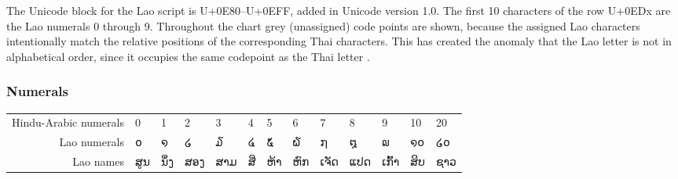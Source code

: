 The Unicode block for the Lao script is U+0E80–U+0EFF, added in Unicode version 1.0. The first 10 characters of the row U+0EDx are the Lao numerals 0 through 9. Throughout the chart grey (unassigned) code points are shown, because the assigned Lao characters intentionally match the relative positions of the corresponding Thai characters. This has created the anomaly that the Lao letter  is not in alphabetical order, since it occupies the same codepoint as the Thai letter .

\begin{scriptexample}[]{}
\end{scriptexample}

\subsubsection{Numerals}
\bgroup
\lao
\begin{tabular}{rllllllllllll}
Hindu-Arabic numerals	&0	&1	&2	&3	&4	&5	&6	&7	&8	&9	&10 &	20\\
Lao numerals	&໐	&໑	&໒	&໓	&໔	&໕	&໖	&໗	&໘	&໙	&໑໐	&໒໐\\
Lao names	&ສູນ	&ນຶ່ງ	&ສອງ	&ສາມ	&ສີ່	&ຫ້າ 	&ຫົກ	&ເຈັດ	&ແປດ	&ເກົ້າ	&ສິບ	&ຊາວ\\
\end{tabular}
\egroup



